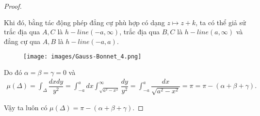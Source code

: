 \begin{proof}
\begin{enumerate}
        Khi đó, bằng tác động phép đẳng cự phù hợp có dạng $z\mapsto z+k$, ta có thể giả sử trắc địa qua $A,C$ là $h-line(-a,\infty)$, trắc địa qua $B,C$ là $h-line(a,\infty)$ và đẳng cự qua $A,B$ là $h-line(-a,a)$.
        \begin{figure}[htp!]
        \centering
        \texttt{[image: images/Gauss-Bonnet\_4.png]}
        \end{figure}
        Do đó $\alpha = \beta =\gamma = 0$ và 
        \begin{align*}
            \mu(\Delta) = \int_{\Delta}{\dfrac{dxdy}{y^2}} = \int_{-a}^a{dx}\int_{\sqrt{a^2-x^2}}^{\infty}{\dfrac{dy}{y^2}} = \int_{-a}^a{\dfrac{dx}{\sqrt{a^2-x^2}}} = \pi = \pi -(\alpha+\beta + \gamma).
        \end{align*}
    \end{enumerate}
    Vậy ta luôn có $\mu(\Delta) = \pi -(\alpha+\beta + \gamma).$
\end{proof}
